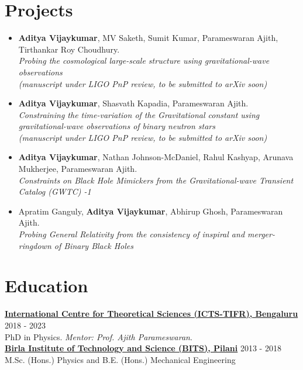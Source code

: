 			\section{Projects}
			\begin{itemize}[leftmargin=*]
				\item \textbf{Aditya Vijaykumar}, MV Saketh, Sumit Kumar, Parameswaran Ajith, Tirthankar Roy Choudhury.\\
				\textit{Probing the cosmological large-scale structure using gravitational-wave observations} \\
				\textit{(manuscript under LIGO PnP review, to be submitted to arXiv soon)}
				\\
				\item \textbf{Aditya Vijaykumar}, Shasvath Kapadia, Parameswaran Ajith.\\
				\textit{Constraining the time-variation of the Gravitational constant using gravitational-wave observations of binary neutron stars} \\
				\textit{(manuscript under LIGO PnP review, to be submitted to arXiv soon)}
				\\
				\item \textbf{Aditya Vijaykumar}, Nathan Johnson-McDaniel, Rahul Kashyap, Arunava Mukherjee, Parameswaran Ajith.\\	
				\textit{Constraints on Black Hole Mimickers from the Gravitational-wave Transient Catalog (GWTC) -1 }
				\\
				\item Apratim Ganguly, \textbf{Aditya Vijaykumar}, Abhirup Ghosh, Parameswaran Ajith.\\	
				\textit{Probing General Relativity from the consistency of inspiral and merger-ringdown of Binary Black Holes}
				
				
			\end{itemize}
			
		
		\section{Education}
		\textbf{\href{https://www.icts.res.in/}{International Centre for Theoretical Sciences (ICTS-TIFR), Bengaluru}} \hfill 2018 - 2023\\
            PhD in Physics. \vspace{0.4em}\textit{Mentor: Prof. Ajith Parameswaran}.\\
            \textbf{\href{http://www.bits-pilani.ac.in/}{Birla Institute of Technology and Science (BITS), Pilani}} \hfill 2013 - 2018\\
		{M.Sc. (Hons.) Physics and B.E. (Hons.) Mechanical Engineering}

